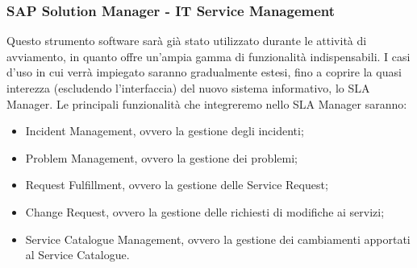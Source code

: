 \subsubsection{SAP Solution Manager - IT Service Management}

Questo strumento software sarà già stato utilizzato durante le attività di avviamento, in quanto offre un'ampia gamma di funzionalità indispensabili. I casi d'uso in cui verrà impiegato saranno gradualmente estesi, fino a coprire la quasi interezza (escludendo l'interfaccia) del nuovo sistema informativo, lo SLA Manager. Le principali funzionalità che integreremo nello SLA Manager saranno:

\begin{itemize}
	\item Incident Management, ovvero la gestione degli incidenti;
    \item Problem Management, ovvero la gestione dei problemi;
    \item Request Fulfillment, ovvero la gestione delle Service Request;
    \item Change Request, ovvero la gestione delle richiesti di modifiche ai servizi;
    \item Service Catalogue Management, ovvero la gestione dei cambiamenti apportati al Service Catalogue.
\end{itemize}

